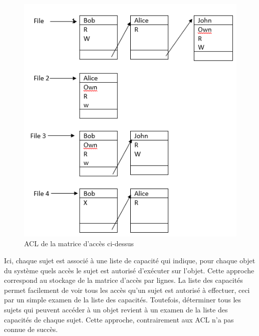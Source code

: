 \begin{figure}[h!]
    \centering
		\includegraphics[scale=0.6]{chap2/images/acl.png}
    \caption{ACL de la matrice d'accès ci-dessus}
	 \label{figAcl}
\end{figure}

\label{sectionListeCapacité}

 Ici, chaque sujet est associé à une liste de capacité qui indique, pour chaque objet du système quels accès le sujet est autorisé d'exécuter sur l'objet. Cette approche correspond au stockage de la matrice d'accès par lignes. La liste des capacités permet facilement de voir tous les accès qu'un sujet est autorisé à effectuer, ceci par un simple examen de la liste des capacités. Toutefois, déterminer tous les sujets qui peuvent accéder à un objet revient à un examen de la liste des capacités de chaque sujet. Cette approche, contrairement aux ACL n'a pas connue de succès. 

